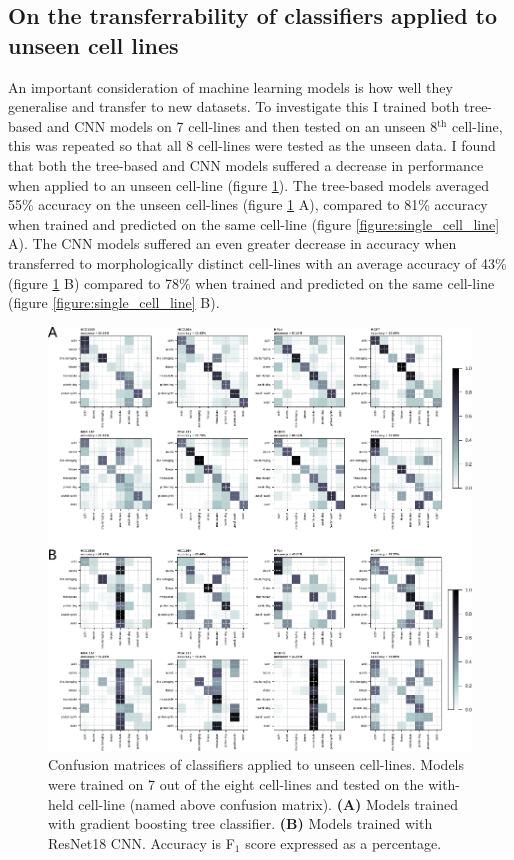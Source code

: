 \documentclass[a4paper,11pt,twoside,openright]{scrbook}
\begin{document}
\subsection{On the transferrability of classifiers applied to unseen cell lines}

An important consideration of machine learning models is how well they generalise and transfer to new datasets.
To investigate this I trained both tree-based and CNN models on 7 cell-lines and then tested on an unseen 8$^\text{th}$ cell-line, this was repeated so that all 8 cell-lines were tested as the unseen data.
I found that both the tree-based and CNN models suffered a decrease in performance when applied to an unseen cell-line (figure \ref{figure:transfer_learning}).
The tree-based models averaged 55\% accuracy on the unseen cell-lines (figure \ref{figure:transfer_learning} A), compared to 81\% accuracy when trained and predicted on the same cell-line (figure \ref{figure:single_cell_line} A).
The CNN models suffered an even greater decrease in accuracy when transferred to morphologically distinct cell-lines with an average accuracy of 43\% (figure \ref{figure:transfer_learning} B) compared to 78\% when trained and predicted on the same cell-line (figure \ref{figure:single_cell_line} B).

\begin{figure}
    \includegraphics[width=1.1\textwidth]{ch2TransferLearning}
    \captionsetup{width=0.8\textwidth}
    \caption[Confusion matrices of classifiers when applied to unseen cell-lines]{
    Confusion matrices of classifiers applied to unseen cell-lines.
    Models were trained on 7 out of the eight cell-lines and tested on the with-held cell-line (named above confusion matrix).
    \textbf{(A)} Models trained with gradient boosting tree classifier.
    \textbf{(B)} Models trained with ResNet18 CNN.
    Accuracy is F$_1$ score expressed as a percentage.
    }
    \label{figure:transfer_learning}
\end{figure}
\end{document}
